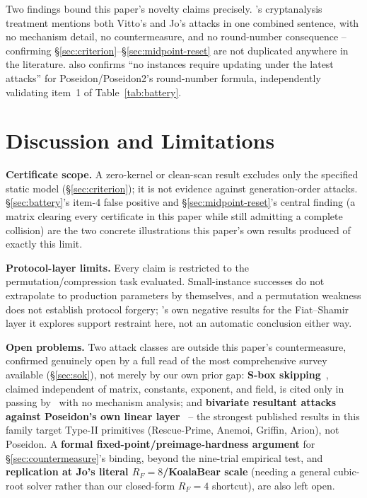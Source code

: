 \documentclass[conference]{IEEEtran}
\theoremstyle{definition}
\theoremstyle{plain}
\begin{document}
Two findings bound this paper's novelty claims precisely.
\cite{sok2026}'s cryptanalysis treatment mentions both Vitto's and Jo's
attacks in one combined sentence, with no mechanism detail, no
countermeasure, and no round-number consequence -- confirming
\S\ref{sec:criterion}--\S\ref{sec:midpoint-reset} are not duplicated
anywhere in the literature. \cite{sok2026} also confirms ``no instances
require updating under the latest attacks'' for Poseidon/Poseidon2's
round-number formula, independently validating item~1 of
Table~\ref{tab:battery}.

\section{Discussion and Limitations}
\label{sec:discussion}

\textbf{Certificate scope.} A zero-kernel or clean-scan result excludes
only the specified static model (\S\ref{sec:criterion}); it is not
evidence against generation-order attacks. \S\ref{sec:battery}'s item-4
false positive and \S\ref{sec:midpoint-reset}'s central finding (a
matrix clearing every certificate in this paper while still admitting a
complete collision) are the two concrete illustrations this paper's own
results produced of exactly this limit.

\textbf{Protocol-layer limits.} Every claim is restricted to the
permutation/compression task evaluated. Small-instance successes
\cite{cryptoeprint:2026/150} do not extrapolate to production
parameters by themselves, and a permutation weakness does not establish
protocol forgery; \cite{cryptoeprint:2026/409}'s own negative results
for the Fiat--Shamir layer it explores support restraint here, not an
automatic conclusion either way.

\textbf{Open problems.} Two attack classes are outside this paper's
countermeasure, confirmed genuinely open by a full read of the most
comprehensive survey available (\S\ref{sec:sok}), not merely by our own
prior gap: \textbf{S-box skipping}~\cite{sboxskip2026}, claimed
independent of matrix, constants, exponent, and field, is cited only in
passing by~\cite{sok2026} with no mechanism analysis; and
\textbf{bivariate resultant attacks against Poseidon's own linear
layer}~\cite{resultant2026} -- the strongest published results in this
family target Type-II primitives (Rescue-Prime, Anemoi, Griffin, Arion),
not Poseidon. A \textbf{formal fixed-point/preimage-hardness argument}
for \S\ref{sec:countermeasure}'s binding, beyond the nine-trial
empirical test, and \textbf{replication at Jo's literal
$R_F=8$/KoalaBear scale} (needing a general cubic-root solver rather
than our closed-form $R_F=4$ shortcut), are also left open.
\end{document}
